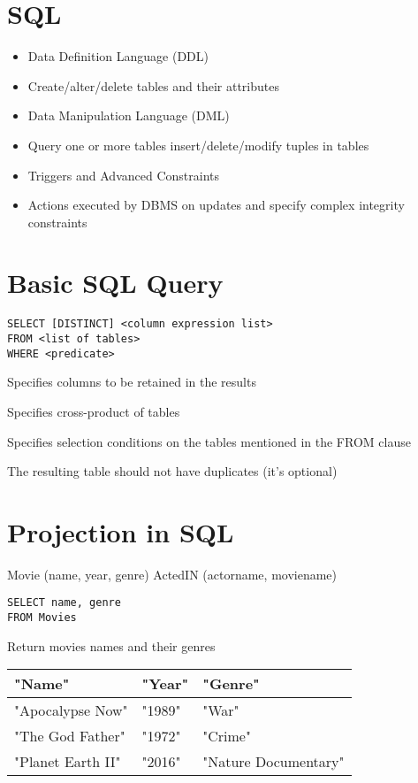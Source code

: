 \documentclass{article}
\begin{document}
\section*{SQL}
\begin{itemize}
    \item Data Definition Language (DDL)
    \item Create/alter/delete tables and their attributes
    \item Data Manipulation Language (DML)
    \item Query one or more tables insert/delete/modify tuples in tables
    \item Triggers and Advanced Constraints
    \item Actions executed by DBMS on updates and specify complex integrity constraints
\end{itemize}

\section*{Basic SQL Query}
\begin{verbatim}
SELECT [DISTINCT] <column expression list>
FROM <list of tables>
WHERE <predicate>
\end{verbatim}
Specifies columns to be retained in the results

Specifies cross-product of tables

Specifies selection conditions on the tables mentioned in the FROM clause

The resulting table should not have duplicates (it's optional)

\section*{Projection in SQL}
Movie (name, year, genre)
ActedIN (actorname, moviename)

\begin{verbatim}
SELECT name, genre
FROM Movies
\end{verbatim}
Return movies names and their genres

\begin{tabular}{lll}
\hline
"Name" & "Year" & "Genre" \\
\hline
"Apocalypse Now" & "1989" & "War" \\
"The God Father" & "1972" & "Crime" \\
"Planet Earth II" & "2016" & "Nature Documentary" \\
\hline
\end{tabular}
\end{document}
